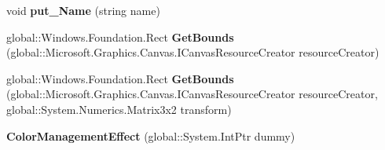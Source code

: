 \begin{DoxyCompactItemize}
\mbox{\label{class_microsoft_1_1_graphics_1_1_canvas_1_1_effects_1_1_color_management_effect_ab9d4a85c384fc708b5c5c6de8ccec040}} 
void {\bfseries put\+\_\+\+Name} (string name)
\item 
\mbox{\label{class_microsoft_1_1_graphics_1_1_canvas_1_1_effects_1_1_color_management_effect_a1f3e48ab364e54824fccfd8a758ff7cc}} 
global\+::\+Windows.\+Foundation.\+Rect {\bfseries Get\+Bounds} (global\+::\+Microsoft.\+Graphics.\+Canvas.\+I\+Canvas\+Resource\+Creator resource\+Creator)
\item 
\mbox{\label{class_microsoft_1_1_graphics_1_1_canvas_1_1_effects_1_1_color_management_effect_acb5d9d935fe858ae3b57861c92b3d846}} 
global\+::\+Windows.\+Foundation.\+Rect {\bfseries Get\+Bounds} (global\+::\+Microsoft.\+Graphics.\+Canvas.\+I\+Canvas\+Resource\+Creator resource\+Creator, global\+::\+System.\+Numerics.\+Matrix3x2 transform)
\item 
\mbox{\label{class_microsoft_1_1_graphics_1_1_canvas_1_1_effects_1_1_color_management_effect_aa98fb6a9945a4d5480799dcff373d48b}} 
{\bfseries Color\+Management\+Effect} (global\+::\+System.\+Int\+Ptr dummy)
\end{DoxyCompactItemize}
